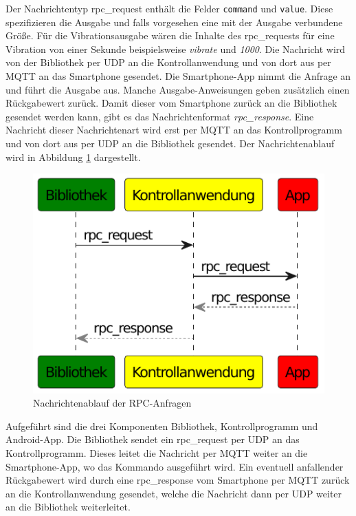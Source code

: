 \documentclass[11pt,a4paper]{report}
\begin{document}
Der Nachrichtentyp rpc\_request enthält die Felder \texttt{command} und \texttt{value}.
Diese spezifizieren die Ausgabe und falls vorgesehen eine mit der Ausgabe verbundene Größe.
Für die Vibrationsausgabe wären die Inhalte des rpc\_requests für eine Vibration von einer Sekunde beispielsweise \textit{vibrate} und \textit{1000}.
Die Nachricht wird von der Bibliothek per UDP an die Kontrollanwendung und von dort aus per MQTT an das Smartphone gesendet.
Die Smartphone-App nimmt die Anfrage an und führt die Ausgabe aus.
Manche Ausgabe-Anweisungen geben zusätzlich einen Rückgabewert zurück.
Damit dieser vom Smartphone zurück an die Bibliothek gesendet werden kann, gibt es das Nachrichtenformat \textit{rpc\_response}.
Eine Nachricht dieser Nachrichtenart wird erst per MQTT an das Kontrollprogramm und von dort aus per UDP an die Bibliothek gesendet.
Der Nachrichtenablauf wird in Abbildung \ref{fig:message_flow_rpc} dargestellt.
\begin{figure}[htbp]
\centering
\includegraphics[width=.6\textwidth]{images/message_flow_rpc.pdf}
\caption{Nachrichtenablauf der RPC-Anfragen}
\label{fig:message_flow_rpc}
\end{figure}
Aufgeführt sind die drei Komponenten Bibliothek, Kontrollprogramm und Android-App.
Die Bibliothek sendet ein rpc\_request per UDP an das Kontrollprogramm.
Dieses leitet die Nachricht per MQTT weiter an die Smartphone-App, wo das Kommando ausgeführt wird.
Ein eventuell anfallender Rückgabewert wird durch eine rpc\_response vom Smartphone per MQTT zurück an die Kontrollanwendung gesendet, welche die Nachricht dann per UDP weiter an die Bibliothek weiterleitet.
\end{document}
